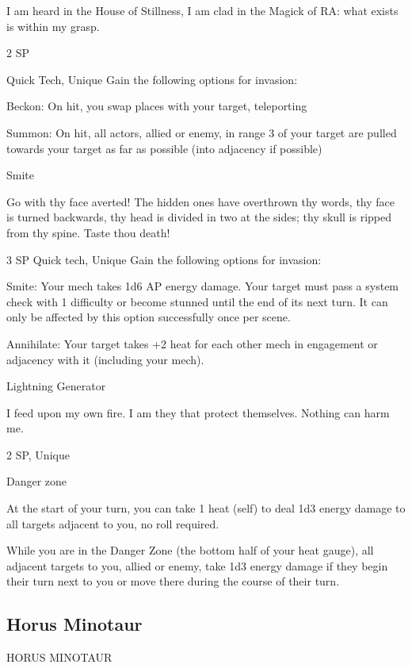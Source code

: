 I am heard in the House of Stillness, I am clad in the Magick of RA: what exists is within my grasp.  

2 SP  

Quick Tech, Unique  
Gain the following options for invasion:
 
         Beckon: On hit, you swap places with your target, teleporting
 
         Summon: On hit, all actors, allied or enemy, in range 3 of your target are pulled towards  
         your target as far as possible (into adjacency if possible)  
	          

Smite  

Go with thy face averted! The hidden ones have overthrown thy words, thy face is turned backwards, thy  
head is divided in two at the sides; thy skull is ripped from thy spine. Taste thou death!
 

3 SP  
Quick tech, Unique  
Gain the following options for invasion:
 
         	Smite: Your mech takes 1d6 AP energy damage. Your target must pass a system check  
         with 1 difficulty or become stunned until the end of its next turn. It can only be affected by  
         this option successfully once per scene.
 
         Annihilate: Your target takes +2 heat for each other mech in engagement or adjacency  
         with it (including your mech).  

Lightning Generator
 

I feed upon my own fire. I am they that protect themselves. Nothing can harm me.  

2 SP, Unique
 

Danger zone
 
At the start of your turn, you can take 1 heat (self) to deal 1d3 energy damage to all targets  
adjacent to you, no roll required.
 

While you are in the Danger Zone (the bottom half of your heat gauge), all adjacent targets to  
you, allied or enemy, take 1d3 energy damage if they begin their turn next to you or move there  
during the course of their turn.
 

                                                                                                                       \subsection{Horus Minotaur}


                                          HORUS MINOTAUR  

